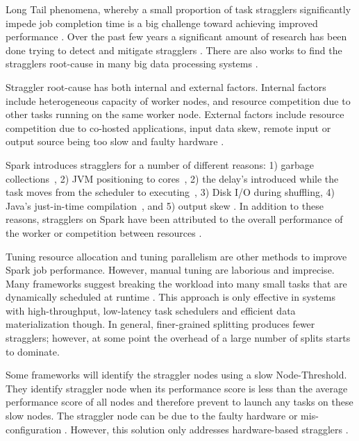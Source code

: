 \label{background}
Long Tail phenomena, whereby a small proportion of task stragglers significantly impede job completion time is a big challenge toward achieving improved performance \cite{Garraghan2016}.
Over the past few years a significant amount of research has been done trying to detect and mitigate stragglers \cite{Rosen2012, Dean2004, Chen2014, Bhandare2016, Kwon2012}. 
There are also works to find the stragglers root-cause in many big data processing systems \cite{Ballani2011, Ananthanarayanan2014, Jeyakumar2013, Li2014, Zaharia2012}.

Straggler root-cause has both internal and external factors. 
Internal factors include heterogeneous capacity of worker nodes, and resource competition due to other tasks running on the same worker node. 
External factors include resource competition due to co-hosted applications, input data skew, remote input or output source being too slow and faulty hardware \cite{Chen2014}.

Spark introduces stragglers for a number of different reasons: 1) garbage collections~\cite{Kyong2017,Ousterhout2017}, 2) JVM positioning to cores~\cite{Kyong2017}, 
2) the delay's introduced while the task moves from the scheduler to executing~\cite{Gittens2016}, 3) Disk I/O during shuffling, 4) Java's just-in-time compilation~\cite{Ousterhout2017}, 
and 5) output skew \cite{Ousterhout2017}. 
In addition to these reasons, stragglers on Spark have been attributed to the overall performance of the worker or competition between resources \cite{Yang2016}.

Tuning resource allocation and tuning parallelism are other methods to improve Spark job performance. 
However, manual tuning are laborious and imprecise. 
Many frameworks suggest breaking the workload into many small tasks that are dynamically scheduled at runtime \cite{Rosen2012}. 
This approach is only effective in systems with high-throughput, low-latency task schedulers and efficient data materialization though.
In general, finer-grained splitting produces fewer stragglers; however, at some point the overhead of a large number of splits starts to dominate. 

Some frameworks will identify the straggler nodes using a slow Node-Threshold. 
They identify straggler node when its performance score is less than the average performance score of all nodes and therefore prevent to launch any tasks on these slow nodes. 
The straggler node can be due to the faulty hardware or mis-configuration \cite{Dean2004}. 
However, this solution only addresses hardware-based stragglers \cite{Chen2014}.

